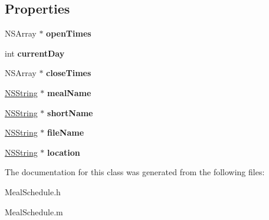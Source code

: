 \subsection*{Properties}
\begin{DoxyCompactItemize}
\item 
\hypertarget{interface_meal_schedule_a7d52b5829a583c45a8b6e3d843e05e4c}{
NSArray $\ast$ {\bfseries openTimes}}
\label{interface_meal_schedule_a7d52b5829a583c45a8b6e3d843e05e4c}

\item 
\hypertarget{interface_meal_schedule_abb6f3454d76d78a3e57ad0ae59e71623}{
int {\bfseries currentDay}}
\label{interface_meal_schedule_abb6f3454d76d78a3e57ad0ae59e71623}

\item 
\hypertarget{interface_meal_schedule_ad016f6037d77bf97ad0db543e818c640}{
NSArray $\ast$ {\bfseries closeTimes}}
\label{interface_meal_schedule_ad016f6037d77bf97ad0db543e818c640}

\item 
\hypertarget{interface_meal_schedule_aab95f8f284c68f88407d181bba2f6f94}{
\hyperlink{class_n_s_string}{NSString} $\ast$ {\bfseries mealName}}
\label{interface_meal_schedule_aab95f8f284c68f88407d181bba2f6f94}

\item 
\hypertarget{interface_meal_schedule_af024c34a72ef1d4864f50055aef7a731}{
\hyperlink{class_n_s_string}{NSString} $\ast$ {\bfseries shortName}}
\label{interface_meal_schedule_af024c34a72ef1d4864f50055aef7a731}

\item 
\hypertarget{interface_meal_schedule_a4fb12c9b5fd5cdd464f2ccd0ac853dd3}{
\hyperlink{class_n_s_string}{NSString} $\ast$ {\bfseries fileName}}
\label{interface_meal_schedule_a4fb12c9b5fd5cdd464f2ccd0ac853dd3}

\item 
\hypertarget{interface_meal_schedule_a0b68d17875a1b2360c79977465f7a199}{
\hyperlink{class_n_s_string}{NSString} $\ast$ {\bfseries location}}
\label{interface_meal_schedule_a0b68d17875a1b2360c79977465f7a199}

\end{DoxyCompactItemize}


The documentation for this class was generated from the following files:\begin{DoxyCompactItemize}
\item 
MealSchedule.h\item 
MealSchedule.m\end{DoxyCompactItemize}
